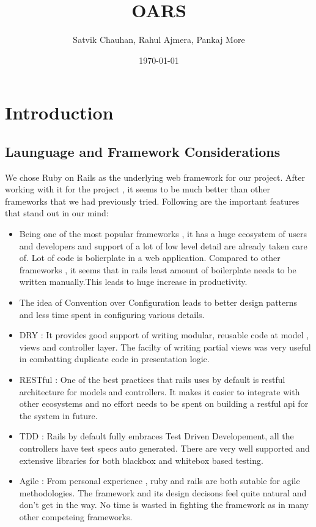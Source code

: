 \documentclass[letterpaper,12pt]{article}
\title{OARS}
\author{Satvik Chauhan, Rahul Ajmera, Pankaj More}
\date{{\small \today}}
\begin{document}
\maketitle
\section{Introduction}
\subsection{Launguage and Framework Considerations}

We chose Ruby on Rails as the underlying web framework for our
project. After working with it for the project , it seems to be much
better than other frameworks that we had previously tried. Following
are the important features that stand out in our mind:
\begin{itemize}
\item Being one of the most popular frameworks , it has a huge
  ecosystem of users and developers and support of a lot of low level
  detail are already taken care of. Lot of code is bolierplate in a
  web application. Compared to other frameworks , it seems that in
  rails least amount of boilerplate needs to be written manually.This
  leads to huge increase in productivity.
\item The idea of Convention over Configuration leads to better design
  patterns and less time spent in configuring various details.
\item DRY : It provides good support of writing modular, reusable code
  at model , views and controller layer. The facilty of writing
  partial views was very useful in combatting duplicate code in
  presentation logic. 
\item RESTful : One of the best practices that rails uses by default
  is restful architecture for models and controllers. It makes it
  easier to integrate with other ecosystems and no effort needs to be
  spent on building a restful api for the system in future.
\item TDD : Rails by default fully embraces Test Driven Developement,
  all the controllers have test specs auto generated. There are very
  well supported and extensive libraries for both blackbox and
  whitebox based testing.
\item Agile : From personal experience , ruby and rails are both
  sutable for agile methodologies. The framework and its design
  decisons feel quite natural and don't get in the way. No time is
  wasted in fighting the framework as in many other competeing
  frameworks.
\end{itemize}
\end{document}
